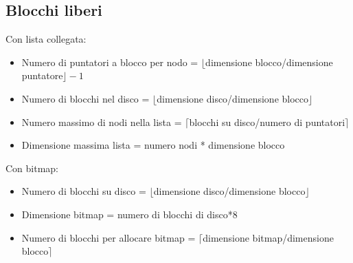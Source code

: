 \documentclass[10pt]{article}
\begin{document}
\subsection*{Blocchi liberi}
Con lista collegata:
\begin{itemize}
    \item Numero di puntatori a blocco per nodo = $\lfloor$dimensione blocco/dimensione puntatore$\rfloor-1$
    \item Numero di blocchi nel disco = $\lfloor$dimensione disco/dimensione blocco$\rfloor$
    \item Numero massimo di nodi nella lista = $\lceil$blocchi su disco/numero di puntatori$\rceil$
    \item Dimensione massima lista = numero nodi * dimensione blocco
\end{itemize}
Con bitmap:
\begin{itemize}
    \item Numero di blocchi su disco = $\lfloor$dimensione disco/dimensione blocco$\rfloor$
    \item Dimensione bitmap = numero di blocchi di disco*8
    \item Numero di blocchi per allocare bitmap = $\lceil$dimensione bitmap/dimensione blocco$\rceil$
\end{itemize}
\end{document}
